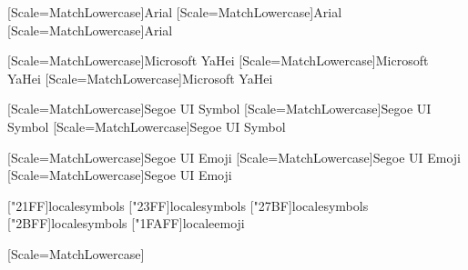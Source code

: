 [Scale=MatchLowercase]{Arial}
[Scale=MatchLowercase]{Arial}
[Scale=MatchLowercase]{Arial}

[Scale=MatchLowercase]{Microsoft YaHei}
[Scale=MatchLowercase]{Microsoft YaHei}
[Scale=MatchLowercase]{Microsoft YaHei}

[Scale=MatchLowercase]{Segoe UI Symbol}
[Scale=MatchLowercase]{Segoe UI Symbol}
[Scale=MatchLowercase]{Segoe UI Symbol}

[Scale=MatchLowercase]{Segoe UI Emoji}
[Scale=MatchLowercase]{Segoe UI Emoji}
[Scale=MatchLowercase]{Segoe UI Emoji}

["21FF]{locale}{symbols}
["23FF]{locale}{symbols}
["27BF]{locale}{symbols}
["2BFF]{locale}{symbols}
["1FAFF]{locale}{emoji}

\setmonofont{Courier New}[Scale=MatchLowercase]
